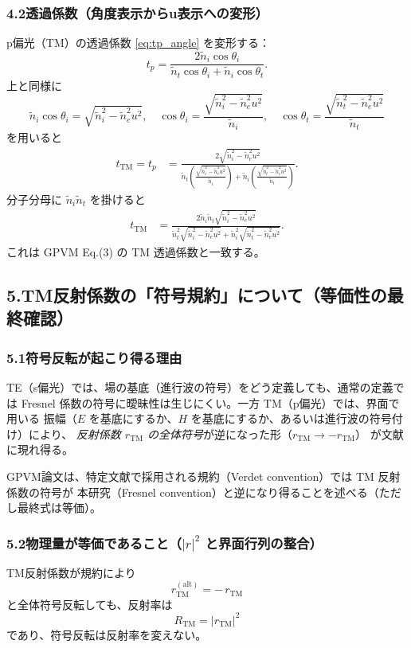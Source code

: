 \subsubsection*{4.2\;透過係数（角度表示からu表示への変形）}
p偏光（TM）の透過係数 \eqref{eq:tp_angle} を変形する：
\[
t_p=\frac{2\tilde n_i\cos\theta_i}{\tilde n_t\cos\theta_i+\tilde n_i\cos\theta_t}.
\]
上と同様に
\[
\tilde n_i\cos\theta_i=\sqrt{\tilde n_i^2-\tilde n_e^2u^2},\quad
\cos\theta_i=\frac{\sqrt{\tilde n_i^2-\tilde n_e^2u^2}}{\tilde n_i},\quad
\cos\theta_t=\frac{\sqrt{\tilde n_t^2-\tilde n_e^2u^2}}{\tilde n_t}
\]
を用いると
\begin{align}
t_{\mathrm{TM}}
=t_p
&=\frac{2\sqrt{\tilde n_i^2-\tilde n_e^2u^2}}
{\tilde n_t\left(\frac{\sqrt{\tilde n_i^2-\tilde n_e^2u^2}}{\tilde n_i}\right)
+\tilde n_i\left(\frac{\sqrt{\tilde n_t^2-\tilde n_e^2u^2}}{\tilde n_t}\right)}.
\label{eq:tTM_intermediate}
\end{align}
分子分母に $\tilde n_i\tilde n_t$ を掛けると
\begin{align}
t_{\mathrm{TM}}
&=\frac{
2\tilde n_i\tilde n_t\sqrt{\tilde n_i^2-\tilde n_e^2u^2}
}{
\tilde n_t^2\sqrt{\tilde n_i^2-\tilde n_e^2u^2}
+\tilde n_i^2\sqrt{\tilde n_t^2-\tilde n_e^2u^2}
}.
\label{eq:tTM_u}
\end{align}
これは GPVM Eq.(3) の TM 透過係数と一致する。

\subsection*{5.\;TM反射係数の「符号規約」について（等価性の最終確認）}
\subsubsection*{5.1\;符号反転が起こり得る理由}
TE（s偏光）では、場の基底（進行波の符号）をどう定義しても、通常の定義では
Fresnel 係数の符号に曖昧性は生じにくい。一方 TM（p偏光）では、界面で用いる
振幅（$E$ を基底にするか、$H$ を基底にするか、あるいは進行波の符号付け）により、
\emph{反射係数 $r_{\mathrm{TM}}$ の全体符号}が逆になった形（$r_{\mathrm{TM}}\to -r_{\mathrm{TM}}$）
が文献に現れ得る。

GPVM論文は、特定文献で採用される規約（Verdet convention）では TM 反射係数の符号が
本研究（Fresnel convention）と逆になり得ることを述べる（ただし最終式は等価）。

\subsubsection*{5.2\;物理量が等価であること（$|r|^2$ と界面行列の整合）}
TM反射係数が規約により
\[
r_{\mathrm{TM}}^{(\mathrm{alt})} = -\,r_{\mathrm{TM}}
\]
と全体符号反転しても、反射率は
\[
R_{\mathrm{TM}} = |r_{\mathrm{TM}}|^2
\]
であり、符号反転は反射率を変えない。

